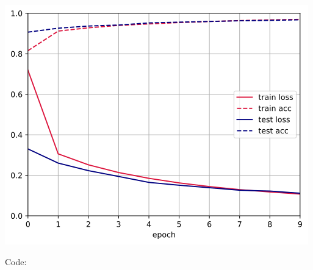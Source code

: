 \documentclass[submit]{harvardml}
\begin{document}
\includegraphics[width=\linewidth]{hw3/ML plot.png}

Code:
\end{document}
